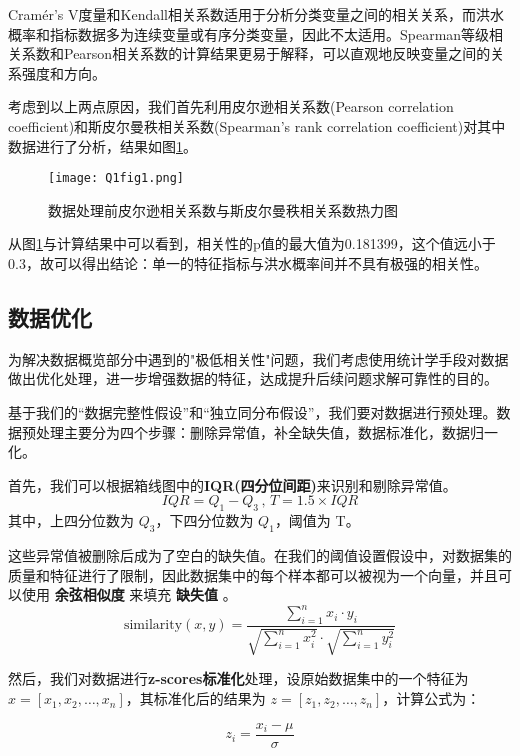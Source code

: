 \documentclass[withoutpreface,bwprint]{cumcmthesis} %
\begin{document}
Cramér’s V度量和Kendall相关系数适用于分析分类变量之间的相关关系，而洪水概率和指标数据多为连续变量或有序分类变量，因此不太适用。Spearman等级相关系数和Pearson相关系数的计算结果更易于解释，可以直观地反映变量之间的关系强度和方向。

考虑到以上两点原因，我们首先利用皮尔逊相关系数(Pearson correlation coefficient)和斯皮尔曼秩相关系数(Spearman’s rank correlation coefficient)对其中数据进行了分析，结果如图\ref{q1fig1}。
	\begin{figure}[htbp]
		\centering
		\texttt{[image: Q1fig1.png]}
		\caption{数据处理前皮尔逊相关系数与斯皮尔曼秩相关系数热力图}\label{q1fig1}
	\end{figure}
从图\ref{q1fig1}与计算结果中可以看到，相关性的p值的最大值为0.181399，这个值远小于0.3，故可以得出结论：单一的特征指标与洪水概率间并不具有极强的相关性。
\subsection{数据优化}
为解决数据概览部分中遇到的"极低相关性"问题，我们考虑使用统计学手段对数据做出优化处理，进一步增强数据的特征，达成提升后续问题求解可靠性的目的。

基于我们的“数据完整性假设”和“独立同分布假设”，我们要对数据进行预处理。数据预处理主要分为四个步骤：删除异常值，补全缺失值，数据标准化，数据归一化。

首先，我们可以根据箱线图中的\textbf{IQR(四分位间距)}来识别和剔除异常值。
\begin{equation}\label{eq1}
	IQR=Q_1-Q_3\, ,\, T=1.5\times IQR
\end{equation}
其中，上四分位数为 $Q_3$，下四分位数为 $Q_1$，阈值为 T。

这些异常值被删除后成为了空白的缺失值。在我们的阈值设置假设中，对数据集的质量和特征进行了限制，因此数据集中的每个样本都可以被视为一个向量，并且可以使用 \textbf{余弦相似度} 来填充 \textbf{缺失值} 。
\begin{equation}\label{eq2}
	\text{similarity} (x, y) = \frac{\sum_{i=1}^{n} x_i \cdot y_i}{\sqrt{\sum_{i=1}^{n} x_i^2} \cdot \sqrt{\sum_{i=1}^{n} y_i^2}}
\end{equation}

然后，我们对数据进行\textbf{z-scores标准化}处理，设原始数据集中的一个特征为 \( x = [x_1, x_2, \ldots, x_n] \)，其标准化后的结果为 \( z = [z_1, z_2, \ldots, z_n] \)，计算公式为：

\begin{equation}
z_i = \frac{x_i - \mu}{\sigma}
\end{equation}
\end{document}
